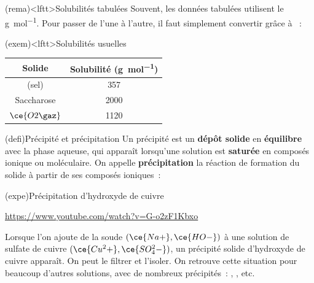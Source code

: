 \documentclass[../../main/main.tex]{subfiles}
\begin{document}
\begin{tcb*}(rema)<lftt>{Solubilités tabulées}
	Souvent, les données tabulées utilisent le \si{g.mol^{-1}}. Pour passer de
	l'une à l'autre, il faut simplement convertir grâce à ~:
	\psw{
		\[
			m\ind{dissout} = M n\ind{dissout}
		\]
	}
	\vspace{-15pt}
\end{tcb*}

\begin{tcb*}(exem)<lftt>{Solubilités usuelles}
	\begin{center}
		\begin{tabular}{cc}
			\toprule
			\textbf{Solide} & \textbf{Solubilité} (\si{g.mol^{-1}})
			\\
			\midrule
			\ce{NaCl} (sel) & \num{357}
			\\
			Saccharose      & \num{2000}
			\\
			$\ce{O2\gaz}$   & \num{1120}
			\\
			\bottomrule
		\end{tabular}
	\end{center}
\end{tcb*}

\begin{tcb*}(defi){Précipité et précipitation}
	Un précipité est un \textbf{dépôt solide} en \textbf{équilibre} avec la phase
	aqueuse, qui apparaît lorsqu'une solution est \textbf{saturée} en composés
	ionique ou moléculaire.
  \smallbreak
  On appelle \textbf{précipitation} la réaction de formation du solide à partir
  de ses composés ioniques~:
  \psw{
      \[
      p \ce{A+}\aqu{} + q \ce{B-}\aqu{} = \ce{A_pB_q\sol{}}
    \]
  }
  \vspace{-15pt}
\end{tcb*}

\begin{tcb*}(expe){Précipitation d'hydroxyde de cuivre}
	\begin{center}
		\url{https://www.youtube.com/watch?v=G-o2zF1Kbxo}
	\end{center}
	Lorsque l'on ajoute de la soude $(\ce{Na+},\ce{HO-})$ à une solution de sulfate
	de cuivre $(\ce{Cu^2+},\ce{SO_4^2-})$, un précipité solide d'hydroxyde de cuivre
	 apparaît. On peut le filtrer et l'isoler.
	\smallbreak
	On retrouve cette situation
	pour beaucoup d'autres solutions, avec de nombreux précipités~: ,
	, etc.
\end{tcb*}
\end{document}
